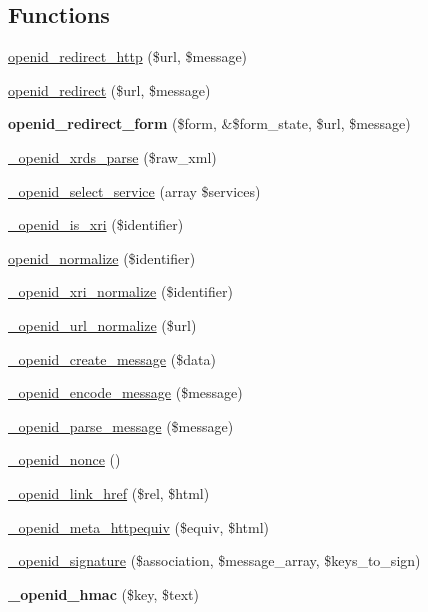 \subsection*{Functions}
\begin{DoxyCompactItemize}
\item 
\hyperlink{openid_8inc_a3c8b7c23742c62aae323c74c8c0f9915}{openid\_\-redirect\_\-http} (\$url, \$message)
\item 
\hyperlink{openid_8inc_a6836e61a578613959fe00ca83209ae2f}{openid\_\-redirect} (\$url, \$message)
\item 
\hypertarget{openid_8inc_ad497a31d30bffb6a4bc6cd9914e07f7b}{
{\bfseries openid\_\-redirect\_\-form} (\$form, \&\$form\_\-state, \$url, \$message)}
\label{openid_8inc_ad497a31d30bffb6a4bc6cd9914e07f7b}

\item 
\hyperlink{openid_8inc_a3ef1c9170e34e325cc88371a06928a0f}{\_\-openid\_\-xrds\_\-parse} (\$raw\_\-xml)
\item 
\hyperlink{openid_8inc_aa8b2298a6e68ea456e22b33b44aa276b}{\_\-openid\_\-select\_\-service} (array \$services)
\item 
\hyperlink{openid_8inc_a867ccbcc067a82d3bc691a6cdc1ad9f4}{\_\-openid\_\-is\_\-xri} (\$identifier)
\item 
\hyperlink{openid_8inc_a7ff842426a1f176ec3f247c5fd2ed7b2}{openid\_\-normalize} (\$identifier)
\item 
\hyperlink{openid_8inc_adef3bc56b5a4c57ce996187cffb16492}{\_\-openid\_\-xri\_\-normalize} (\$identifier)
\item 
\hyperlink{openid_8inc_a19b00511427ad7985408f16c079a2546}{\_\-openid\_\-url\_\-normalize} (\$url)
\item 
\hyperlink{openid_8inc_a5d5952e825b3e17cc2765760baf69d4f}{\_\-openid\_\-create\_\-message} (\$data)
\item 
\hyperlink{openid_8inc_a367a73e53a7544157b49ffbedcbdb444}{\_\-openid\_\-encode\_\-message} (\$message)
\item 
\hyperlink{openid_8inc_ab5f88df8b540f08bd28e8a508bb49175}{\_\-openid\_\-parse\_\-message} (\$message)
\item 
\hyperlink{openid_8inc_a7f413b6dbcae0aab572b51b57f08b076}{\_\-openid\_\-nonce} ()
\item 
\hyperlink{openid_8inc_a413931ae272accf7e4161d5b032d4631}{\_\-openid\_\-link\_\-href} (\$rel, \$html)
\item 
\hyperlink{openid_8inc_acbf79310505895f32ef771f12addd3bc}{\_\-openid\_\-meta\_\-httpequiv} (\$equiv, \$html)
\item 
\hyperlink{openid_8inc_a94a239a1dacef65306d0078198035cc7}{\_\-openid\_\-signature} (\$association, \$message\_\-array, \$keys\_\-to\_\-sign)
\item 
\hypertarget{openid_8inc_a2294d8c885fe408e7e1981e51e880ebc}{
{\bfseries \_\-openid\_\-hmac} (\$key, \$text)}
\label{openid_8inc_a2294d8c885fe408e7e1981e51e880ebc}


\end{DoxyCompactItemize}
